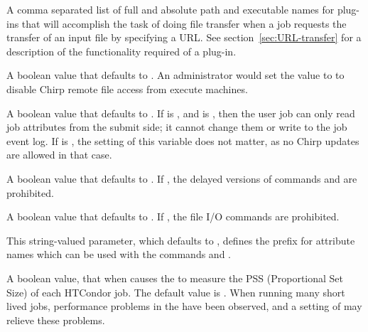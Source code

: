 \begin{description}
\label{param:FiletransferPlugins} 
\item[\Macro{FILETRANSFER\_PLUGINS}]
  A comma separated list of full and absolute path and executable names
  for plug-ins that will accomplish the task of doing file transfer
  when a job requests the transfer of an input file by specifying a URL. 
  See section~\ref{sec:URL-transfer} for a description of the functionality
  required of a plug-in.

\label{param:EnableChirp} 
\item[\Macro{ENABLE\_CHIRP}]
  A boolean value that defaults to . An administrator
  would set the value to  to disable Chirp remote file access 
  from execute machines. 

\label{param:EnableChirpUpdates}
\item[\Macro{ENABLE\_CHIRP\_UPDATES}]
  A boolean value that defaults to .  If 
  is , and  is ,
  then the user job can only read job attributes from the submit side;
  it cannot change them or write to the job event log.
  If  is ,
  the setting of this variable does not matter, 
  as no Chirp updates are allowed in that case.

\label{param:EnableChirpDelayed}
\item[\Macro{ENABLE\_CHIRP\_DELAYED}]
  A boolean value that defaults to . 
  If , the delayed versions of  commands
   and  are prohibited.

\label{param:EnableChirpIO}
\item[\Macro{ENABLE\_CHIRP\_IO}]
  A boolean value that defaults to .  If ,
  the file I/O  commands are prohibited.

\label{param:RemoteUpdatePrefix}
\item[\Macro{REMOTE\_UPDATE\_PREFIX}]
  This string-valued parameter, which defaults to ,
  defines the prefix for attribute names which can be used with the
   commands  and 
  .

\label{param:UsePSS} 
\item[\Macro{USE\_PSS}]
  A boolean value, that when  causes the  to
  measure the PSS (Proportional Set Size) of each HTCondor job.
  The default value is .
  When running many short lived jobs, performance problems in 
  the  have been observed, and a setting of 
  may relieve these problems.


\end{description}
